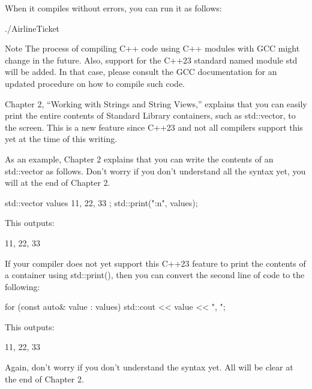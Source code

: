 When it compiles without errors, you can run it as follows:

\begin{shell}
./AirlineTicket
\end{shell}

\begin{myNotic}{Note}
The process of compiling C++ code using C++ modules with GCC might change in the future. Also, support for the C++23 standard named module std will be added. In that case, please consult the GCC documentation for an updated procedure on how to compile such code.
\end{myNotic}


Chapter 2, “Working with Strings and String Views,” explains that you can easily print the entire contents of Standard Library containers, such as std::vector, to the screen. This is a new feature since C++23 and not all compilers support this yet at the time of this writing.

As an example, Chapter 2 explains that you can write the contents of an std::vector as follows.
Don’t worry if you don’t understand all the syntax yet, you will at the end of Chapter 2.

\begin{cpp}
std::vector values { 11, 22, 33 };
std::print("{:n}", values);
\end{cpp}

This outputs:

\begin{shell}
11, 22, 33
\end{shell}

If your compiler does not yet support this C++23 feature to print the contents of a container using std::print(), then you can convert the second line of code to the following:

\begin{cpp}
for (const auto& value : values) { std::cout << value << ", "; }
\end{cpp}

This outputs:

\begin{shell}
11, 22, 33
\end{shell}

Again, don’t worry if you don’t understand the syntax yet. All will be clear at the end of Chapter 2.



